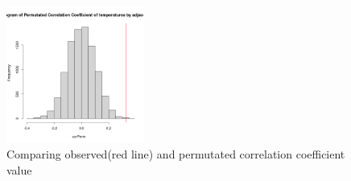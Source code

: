 \documentclass[8pt,notitlepage]{extarticle}
\begin{document}
  \begin{figure}[h!]
    \centering
    \graphicspath{ {../data} }
    \includegraphics[width=0.4\textwidth]{PermutationTest.png}
    \caption{Comparing observed(red line) and permutated correlation coefficient value}
    \label{fig:my_label}
  \end{figure}
\end{document}
